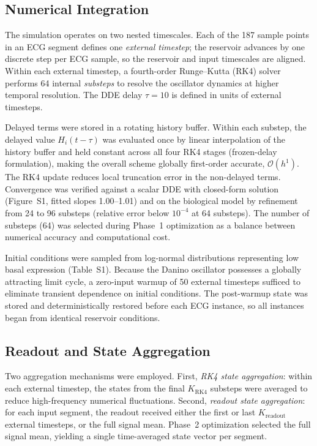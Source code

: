 \documentclass[journal=asbcd6,manuscript=article,keywords]{achemso}
\begin{document}
\subsection{Numerical Integration}
The simulation operates on two nested timescales.
Each of the 187 sample points in an ECG segment defines one \textit{external timestep}; the reservoir advances by one discrete step per ECG sample, so the reservoir and input timescales are aligned.
Within each external timestep, a fourth-order Runge--Kutta (RK4) solver~\cite{Butcher2016} performs 64 internal \textit{substeps} to resolve the oscillator dynamics at higher temporal resolution.
The DDE delay $\tau = 10$ is defined in units of external timesteps.

Delayed terms were stored in a rotating history buffer.
Within each substep, the delayed value $H_i(t-\tau)$ was evaluated once by linear interpolation of the history buffer and held constant across all four RK4 stages (frozen-delay formulation), making the overall scheme globally first-order accurate, $\mathcal{O}(h^1)$. 
The RK4 update reduces local truncation error in the non-delayed terms.
Convergence was verified against a scalar DDE with closed-form solution (Figure~S1, fitted slopes 1.00--1.01) and on the biological model by refinement from 24 to 96 substeps (relative error below $10^{-4}$ at 64 substeps).
The number of substeps (64) was selected during Phase~1 optimization as a balance between numerical accuracy and computational cost.

Initial conditions were sampled from log-normal distributions representing low basal expression (Table~S1).
Because the Danino oscillator possesses a globally attracting limit cycle, a zero-input warmup of 50 external timesteps sufficed to eliminate transient dependence on initial conditions. 
The post-warmup state was stored and deterministically restored before each ECG instance, so all instances began from identical reservoir conditions.

\subsection{Readout and State Aggregation}
Two aggregation mechanisms were employed.
First, \textit{RK4 state aggregation}: within each external timestep, the states from the final $K_{\mathrm{RK4}}$ substeps were averaged to reduce high-frequency numerical fluctuations.
Second, \textit{readout state aggregation}: for each input segment, the readout received either the first or last $K_{\mathrm{readout}}$ external timesteps, or the full signal mean.
Phase~2 optimization selected the full signal mean, yielding a single time-averaged state vector per segment.
\end{document}
